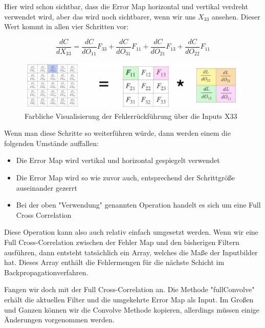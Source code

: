\documentclass[12pt]{article}
\begin{document}
Hier wird schon sichtbar, dass die Error Map horizontal und vertikal verdreht verwendet wird, aber das wird noch sichtbarer, wenn wir uns $X_{33}$ ansehen. Dieser Wert kommt in allen vier Schritten vor:

$$\frac {dC} {dX_{33}} = \frac {dC}{dO_{11}} F_{33} + \frac {dC}{dO_{31}} F_{11} + \frac {dC}{dO_{21}} F_{13} + \frac {dC}{dO_{22}} F_{11}$$

\begin{figure}[H]
\centering
\includegraphics[scale=0.80]{Images/TemporaryPlaceholders/Farbliche Visualisierung der Fehlerrückführung über die Inputs X31.png}
\caption{Farbliche Visualisierung der Fehlerrückführung über die Inputs X33}
\label{Farbliche Visualisierung der Fehlerrückführung über die Inputs X33}
\end{figure}

Wenn man diese Schritte so weiterführen würde, dann werden einem die folgenden Umstände auffallen:
\begin{itemize}
  \item Die Error Map wird vertikal und horizontal gespiegelt verwendet
  \item Die Error Map wird so wie zuvor auch, entsprechend der Schrittgröße auseinander gezerrt  
  \item Bei der oben "Verwendung" genannten Operation handelt es sich um eine Full Cross Correlation
\end{itemize}

Diese Operation kann also auch relativ einfach umgesetzt werden. Wenn wir eine Full Cross-Correlation zwischen der Fehler Map und den bisherigen Filtern ausführen, dann entsteht tatsächlich ein Array, welches die Maße der Inputbilder hat. Dieses Array enthält die Fehlermengen für die nächste Schicht im Backpropagationverfahren. 

Fangen wir doch mit der Full Cross-Correlation an. Die Methode "fullConvolve" erhält die aktuellen Filter und die umgekehrte Error Map als Input. Im Großen und Ganzen können wir die Convolve Methode kopieren, allerdings müssen einige Änderungen vorgenommen werden.
\end{document}
